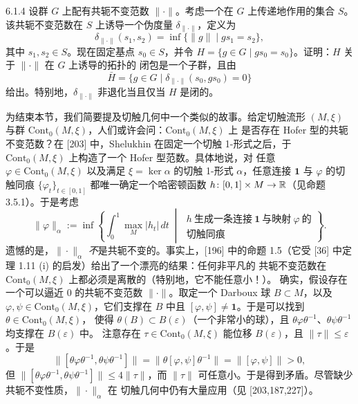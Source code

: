
\begin{wexer}{6.1.4}
  设群 $G$ 上配有共轭不变范数 $\|\cdot\|$。考虑一个在 $G$ 上传递地作用的集合 $S$。
  该共轭不变范数在 $S$ 上诱导一个伪度量 $\delta_{\|\cdot\|}$，定义为
  \[
    \delta_{\|\cdot\|}(s_1,s_2)=\inf\{\|g\|\mid gs_1=s_2\},
  \]
  其中 $s_1,s_2\in S$。现在固定基点 $s_0\in S$，并令
  $H=\{g\in G\mid gs_0=s_0\}$。证明：$H$ 关于 $\|\cdot\|$ 在 $G$ 上诱导的拓扑的
  闭包是一个子群，且由
  \[
    \bar{H}=\{g\in G\mid \delta_{\|\cdot\|}(s_0,gs_0)=0\}
  \]
  给出。特别地，$\delta_{\|\cdot\|}$ 非退化当且仅当 $H$ 是闭的。
\end{wexer}


为结束本节，我们简要提及切触几何中一个类似的故事。给定切触流形
$(M,\xi)$ 与群 $\mathrm{Cont}_0(M,\xi)$，人们或许会问：$\mathrm{Cont}_0(M,\xi)$ 上
是否存在 Hofer 型的共轭不变范数？在 [203] 中，Shelukhin 在固定一个切触
1-形式之后，于 $\mathrm{Cont}_0(M,\xi)$ 上构造了一个 Hofer 型范数。具体地说，对
任意 $\varphi\in\mathrm{Cont}_0(M,\xi)$ 以及满足 $\xi=\ker\alpha$ 的切触 1-形式
$\alpha$，任意连接 $\mathbf{1}$ 与 $\varphi$ 的切触同痕
$\{\varphi_t\}_{t\in[0,1]}$ 都唯一确定一个哈密顿函数
$h\colon[0,1]\times M\to\mathbb{R}$（见命题 3.5.1）。于是考虑
\[
  \|\varphi\|_\alpha:=\inf\left\{
  \int_0^1\max_M|h_t|\,dt\;\middle|\;
  \begin{array}{l}
    h\ \text{生成一条连接}\ \mathbf{1}\ \text{与映射}\ \varphi\ \text{的}\\
    \text{切触同痕}
  \end{array}\right\}.
\]
遗憾的是，$\|\cdot\|_\alpha$ \emph{不}是共轭不变的。事实上，[196] 中的命题
1.5（它受 [36] 中定理 1.11 (i) 的启发）给出了一个漂亮的结果：任何非平凡的
共轭不变范数在 $\mathrm{Cont}_0(M,\xi)$ 上都必须是离散的（特别地，它不能任意小！）。
确实，假设存在一个可以逼近 $0$ 的共轭不变范数 $\|\cdot\|$。取定一个 Darboux 球
$B\subset M$，以及 $\varphi,\psi\in\mathrm{Cont}_0(M,\xi)$，它们支撑在 $B$ 中且
$[\varphi,\psi]\ne\mathbf{1}$。于是可以找到 $\theta\in\mathrm{Cont}_0(M,\xi)$，
使得 $\theta(B)\subset B(\varepsilon)$（一个非常小的球），且
$\theta\varphi\theta^{-1}$、$\theta\psi\theta^{-1}$ 均支撑在 $B(\varepsilon)$ 中。
注意存在 $\tau\in\mathrm{Cont}_0(M,\xi)$ 能位移 $B(\varepsilon)$，且
$\|\tau\|\le\varepsilon$。于是
\[
  \|[\theta\varphi\theta^{-1},\theta\psi\theta^{-1}]\|
  =\|\theta[\varphi,\psi]\theta^{-1}\|=\|[\varphi,\psi]\|>0,
\]
但 $\|[\theta\varphi\theta^{-1},\theta\psi\theta^{-1}]\|\le 4\|\tau\|$，而
$\|\tau\|$ 可任意小。于是得到矛盾。尽管缺少共轭不变性质，$\|\cdot\|_\alpha$ 在
切触几何中仍有大量应用（见 [203,187,227]）。
